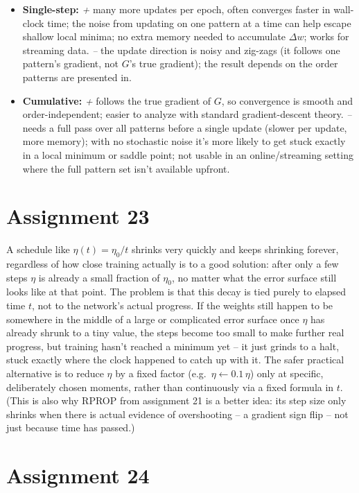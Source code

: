 \documentclass[11pt,a4paper]{article}
\begin{document}
\begin{itemize}
  \item \textbf{Single-step:} \emph{+} many more updates per epoch, often converges faster in
  wall-clock time; the noise from updating on one pattern at a time can help escape shallow local
  minima; no extra memory needed to accumulate $\Delta w$; works for streaming data. \emph{--} the
  update direction is noisy and zig-zags (it follows one pattern's gradient, not $G$'s true gradient);
  the result depends on the order patterns are presented in.
  \item \textbf{Cumulative:} \emph{+} follows the true gradient of $G$, so convergence is smooth and
  order-independent; easier to analyze with standard gradient-descent theory. \emph{--} needs a full
  pass over all patterns before a single update (slower per update, more memory); with no stochastic
  noise it's more likely to get stuck exactly in a local minimum or saddle point; not usable in an
  online/streaming setting where the full pattern set isn't available upfront.
\end{itemize}

\section*{Assignment 23}

A schedule like $\eta(t)=\eta_0/t$ shrinks very quickly and keeps shrinking forever, regardless of how
close training actually is to a good solution: after only a few steps $\eta$ is already a small fraction
of $\eta_0$, no matter what the error surface still looks like at that point. The problem is that this
decay is tied purely to elapsed time $t$, not to the network's actual progress. If the weights still
happen to be somewhere in the middle of a large or complicated error surface once $\eta$ has already
shrunk to a tiny value, the steps become too small to make further real progress, but training hasn't
reached a minimum yet -- it just grinds to a halt, stuck exactly where the clock happened to catch up
with it. The safer practical alternative is to reduce $\eta$ by a fixed factor (e.g.\ $\eta\leftarrow
0.1\,\eta$) only at specific, deliberately chosen moments, rather than continuously via a fixed formula
in $t$. (This is also why RPROP from assignment 21 is a better idea: its step size only shrinks when
there is actual evidence of overshooting -- a gradient sign flip -- not just because time has passed.)

\section*{Assignment 24}
\end{document}
